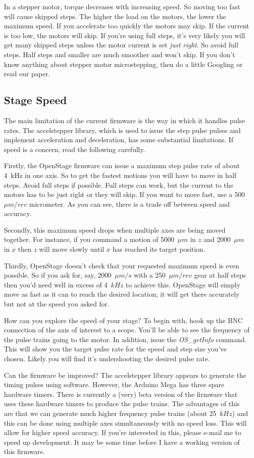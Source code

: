 \documentclass[11pt]{report} %
\begin{document}
In a stepper motor, torque decreases with increasing speed. So moving too fast will cause skipped steps. The higher the load on the motors, the lower the maximum speed. If you accelerate too quickly the motors may skip. If the current is too low, the motors will skip. If you're using full steps, it's very likely you will get many skipped steps unless the motor current is set \textit{just right}. So avoid full steps. Half steps and smaller are much smoother and won't skip. If you don't know anything about stepper motor microstepping, then do a little Googling or read our paper.


\subsection{Stage Speed}
The main limitation of the current firmware is the way in which it handles pulse rates. The accelstepper library, which is used to issue the step pulse pulses and implement acceleration and deceleration, has some substantial limitations. If speed is a concern, read the following carefully. 

Firstly, the OpenStage firmware can issue a maximum step pulse rate of about 4~kHz in one axis. So to get the fastest motions you will have to move in half steps. Avoid full steps if possible. Full steps can work, but the current to the motors has to be just right or they will skip. If you want to move fast, use a 500~$\mu m/rev$ micrometer. As you can see, there is a trade off between speed and accuracy. 

Secondly, this maximum speed drops when multiple axes are being moved together. For instance, if you command a motion of 5000~$\mu m$ in $z$ and 2000~$\mu m$ in $x$ then $z$ will move slowly until $x$ has reached its target position. 

Thirdly, OpenStage doesn't check that your requested maximum speed is even possible. So if you ask for, say, 2000~$\mu m/s$ with a 250~$\mu m/rev$ gear at half steps then you'd need well in excess of 4~$kHz$ to achieve this. OpenStage will simply move as fast as it can to reach the desired location; it will get there accurately but not at the speed you asked for. 

How can you explore the speed of your stage? To begin with, hook up the BNC connection of the axis of interest to a scope. You'll be able to see the frequency of the pulse trains going to the motor. In addition, issue the 
\textit{OS\_getInfo} command. This will show you the target pulse rate for the speed and step size you've chosen. Likely you will find it's undershooting the desired pulse rate. 

Can the firmware be improved? The accelstepper library appears to generate the timing pulses using software. However, the Arduino Mega has three spare hardware timers. There is currently a (very) beta version of the firmware that uses these hardware timers to produce the pulse trains. The advantages of this are that we can generate much higher frequency pulse trains (about 25~$kHz$) and this can be done using multiple axes simultaneously with no speed loss. This will allow for higher speed accuracy. If you're interested in this, please e-mail me to speed up development. It may be some time before I have a working version of this firmware. 
\end{document}

